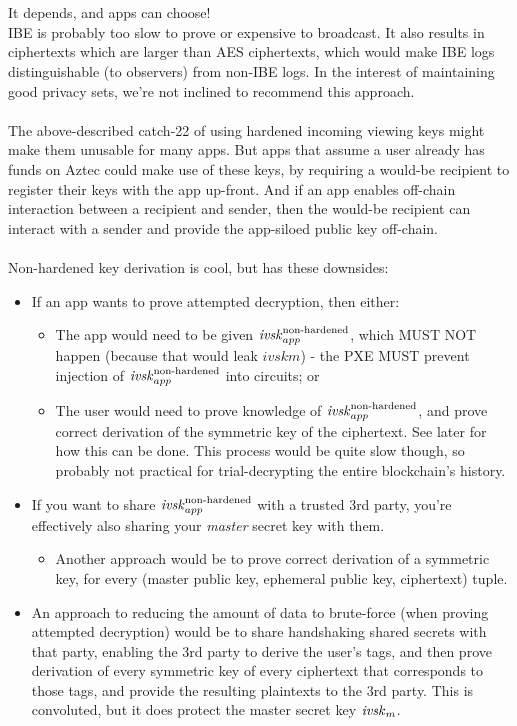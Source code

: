 \hfill\\
\\
It depends, and apps can choose!
\\
IBE is probably too slow to prove or expensive to broadcast.
It also results in ciphertexts which are larger than AES ciphertexts, which would make IBE logs distinguishable (to observers) from non-IBE logs.
In the interest of maintaining good privacy sets, we're not inclined to recommend this approach.\\
\\
The above-described catch-22 of using hardened incoming viewing keys might make them unusable for many apps.
But apps that assume a user already has funds on Aztec could make use of these keys, by requiring a would-be recipient to register their keys with the app up-front.
And if an app enables off-chain interaction between a recipient and sender, then the would-be recipient can interact with a sender and provide the app-siloed public key off-chain.\\
\\
Non-hardened key derivation is cool, but has these downsides:
\begin{itemize}
    \item If an app wants to prove attempted decryption, then either:
    \begin{itemize}
        \item The app would need to be given $\ivskappnonhardened$, which MUST NOT happen (because that would leak $ivskm$) - the PXE MUST prevent injection of $\ivskappnonhardened$ into circuits; or
        \item The user would need to prove knowledge of $\ivskappnonhardened$, and prove correct derivation of the symmetric key of the ciphertext. See later for how this can be done. This process would be quite slow though, so probably not practical for trial-decrypting the entire blockchain's history. 
    \end{itemize} 
    \item If you want to share $\ivskappnonhardened$ with a trusted 3rd party, you're effectively also sharing your \textit{master} secret key with them.
    \begin{itemize}
        \item Another approach would be to prove correct derivation of a symmetric key, for every (master public key, ephemeral public key, ciphertext) tuple.
    \end{itemize}
    \item An approach to reducing the amount of data to brute-force (when proving attempted decryption) would be to share handshaking shared secrets with that party, enabling the 3rd party to derive the user's tags, and then prove derivation of every symmetric key of every ciphertext that corresponds to those tags, and provide the resulting plaintexts to the 3rd party. This is convoluted, but it does protect the master secret key $\ivskm$.
\end{itemize} 
